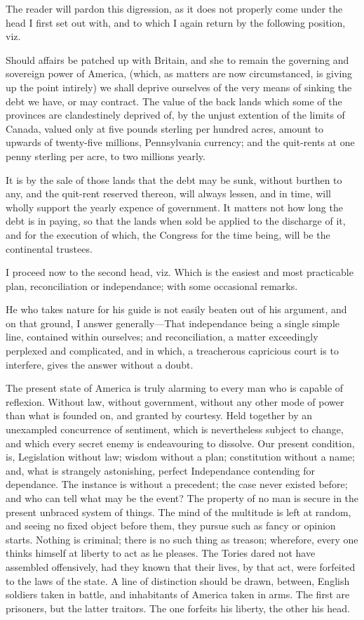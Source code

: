 \documentclass[12pt,oneside]{memoir}
\begin{document}
The reader will pardon this digression, as it does not properly come
under the head I first set out with, and to which I again return by
the following position, viz.

Should affairs be patched up with Britain, and she to remain the
governing and sovereign power of America, (which, as matters are now
circumstanced, is giving up the point intirely) we shall deprive
ourselves of the very means of sinking the debt we have, or may
contract. The value of the back lands which some of the provinces
are clandestinely deprived of, by the unjust extention of the limits
of Canada, valued only at five pounds sterling per hundred acres,
amount to upwards of twenty-five millions, Pennsylvania currency;
and the quit-rents at one penny sterling per acre, to two millions
yearly.

It is by the sale of those lands that the debt may be sunk, without
burthen to any, and the quit-rent reserved thereon, will always
lessen, and in time, will wholly support the yearly expence of
government. It matters not how long the debt is in paying, so that
the lands when sold be applied to the discharge of it, and for the
execution of which, the Congress for the time being, will be the
continental trustees.

I proceed now to the second head, viz. Which is the easiest and most
practicable plan, reconciliation or independance; with some
occasional remarks.

He who takes nature for his guide is not easily beaten out of his 
argument, and on that ground, I answer generally---That independance
being a single simple line, contained within ourselves; and
reconciliation, a matter exceedingly perplexed and complicated, and
in which, a treacherous capricious court is to interfere, gives the
answer without a doubt.

The present state of America is truly alarming to every man who is
capable of reflexion. Without law, without government, without any
other mode of power than what is founded on, and granted by courtesy.
Held together by an unexampled concurrence of sentiment, which is
nevertheless subject to change, and which every secret enemy is
endeavouring to dissolve. Our present condition, is, Legislation
without law; wisdom without a plan; constitution without a name; and,
what is strangely astonishing, perfect Independance contending for
dependance. The instance is without a precedent; the case never
existed before; and who can tell what may be the event? The property
of no man is secure in the present unbraced system of things. The
mind of the multitude is left at random, and seeing no fixed object
before them, they pursue such as fancy or opinion starts. Nothing is
criminal; there is no such thing as treason; wherefore, every one
thinks himself at liberty to act as he pleases. The Tories dared not
have assembled offensively, had they known that their lives, by that
act, were forfeited to the laws of the state. A line of distinction
should be drawn, between, English soldiers taken in battle, and
inhabitants of America taken in arms. The first are prisoners, but
the latter traitors. The one forfeits his liberty, the other his
head.
\end{document}
